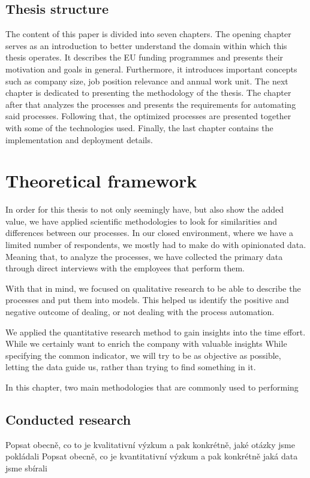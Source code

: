 \documentclass[12pt,oneside]{fithesis2}
\begin{document}
\section{Thesis structure}
The content of this paper is divided into seven chapters. The opening chapter serves as an introduction to better understand the domain within which this thesis operates. It describes the EU funding programmes and presents their motivation and goals in general. Furthermore, it introduces important concepts such as company size, job position relevance and annual work unit. The next chapter is dedicated to presenting the methodology of the thesis. The chapter after that analyzes the processes and presents the requirements for automating said processes. Following that, the optimized processes are presented together with some of the technologies used. Finally, the last chapter contains the implementation and deployment details.

\chapter{Theoretical framework}
In order for this thesis to not only seemingly have, but also show the added value, we have applied scientific methodologies to look for similarities and differences between our processes. In our closed environment, where we have a limited number of respondents, we mostly had to make do with opinionated data. Meaning that, to analyze the processes, we have collected the primary data through direct interviews with the employees that perform them.

With that in mind, we focused on qualitative research to be able to describe the processes and put them into models. This helped us identify the positive and negative outcome of dealing, or not dealing with the process automation. 

We applied the quantitative research method to gain insights into the time effort. While we certainly want to enrich the company with valuable insights 
While specifying the common indicator, we will try to be as objective as possible, letting the data guide us, rather than trying to find something in it.

In this chapter, two main methodologies that are commonly used to performing

\section{Conducted research}
Popsat obecně, co to je kvalitativní výzkum a pak konkrétně, jaké otázky jsme pokládali
Popsat obecně, co je kvantitativní výzkum a pak konkrétně jaká data jsme sbírali
\end{document}
